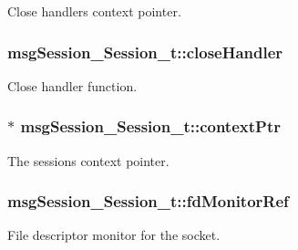 Close handler\textquotesingle{}s context pointer. 

\subsubsection[{\texorpdfstring{close\+Handler}{closeHandler}}]{ msg\+Session\+\_\+\+Session\+\_\+t\+::close\+Handler}\hypertarget{structmsg_session___session__t_a94a31de9a03539c7f3b0843e94b8a9a0}{}\label{structmsg_session___session__t_a94a31de9a03539c7f3b0843e94b8a9a0}


Close handler function. 

\subsubsection[{\texorpdfstring{context\+Ptr}{contextPtr}}]{$\ast$ msg\+Session\+\_\+\+Session\+\_\+t\+::context\+Ptr}\hypertarget{structmsg_session___session__t_a91b36af57e35e10d599fa5677a64c265}{}\label{structmsg_session___session__t_a91b36af57e35e10d599fa5677a64c265}


The session\textquotesingle{}s context pointer. 

\subsubsection[{\texorpdfstring{fd\+Monitor\+Ref}{fdMonitorRef}}]{ msg\+Session\+\_\+\+Session\+\_\+t\+::fd\+Monitor\+Ref}\hypertarget{structmsg_session___session__t_a2a001d5672ed3d496f3145fc9011c8be}{}\label{structmsg_session___session__t_a2a001d5672ed3d496f3145fc9011c8be}


File descriptor monitor for the socket. 


